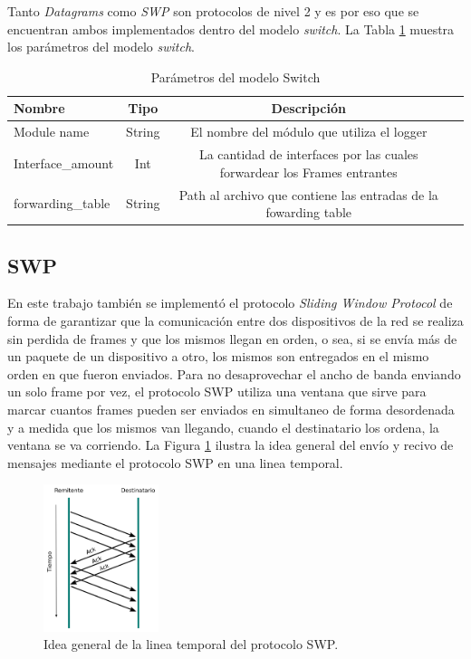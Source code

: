 \documentclass[10pt,a4paper]{article}
\begin{document}
Tanto \textit{Datagrams} como \textit{SWP} son protocolos de nivel 2 y es por eso que se encuentran ambos implementados dentro del modelo \textit{switch}. La Tabla \ref{table: parameters datagrams} muestra los parámetros del modelo \textit{switch}.

\begin{table}[h]
\begin{tabular}{|l|c|c|c|}
  \hline
  \textbf{Nombre} & \textbf{Tipo} & \textbf{Descripción} \\
  \hline
  Module name & String & El nombre del módulo que utiliza el logger \\
  \hline
  Interface\_amount & Int & La cantidad de interfaces por las cuales forwardear los Frames entrantes \\
  \hline
  forwarding\_table & String & Path al archivo que contiene las entradas de la fowarding table \\
  \hline
\end{tabular}
\caption{Parámetros del modelo Switch}
\label{table: parameters datagrams}
\end{table}

\subsection{SWP}

En este trabajo también se implementó el protocolo \textit{Sliding Window Protocol} de forma de garantizar que la comunicación entre dos dispositivos de la red se realiza sin perdida de frames y que los mismos llegan en orden, o sea, si se envía más de un paquete de un dispositivo a otro, los mismos son entregados en el mismo orden en que fueron enviados. Para no desaprovechar el ancho de banda enviando un solo frame por vez, el protocolo SWP utiliza una ventana que sirve para marcar cuantos frames pueden ser enviados en simultaneo de forma desordenada y a medida que los mismos van llegando, cuando el destinatario los ordena, la ventana se va corriendo. La Figura \ref{figure: swp timeline} ilustra la idea general del envío y recivo de mensajes mediante el protocolo SWP en una linea temporal.\\

\begin{figure}[!htb]
    \centering
    \includegraphics[width = 0.3\textwidth]{img/png/swp-timeline.png}
    \caption{Idea general de la linea temporal del protocolo SWP.}
    \label{figure: swp timeline}
\end{figure}
\end{document}
